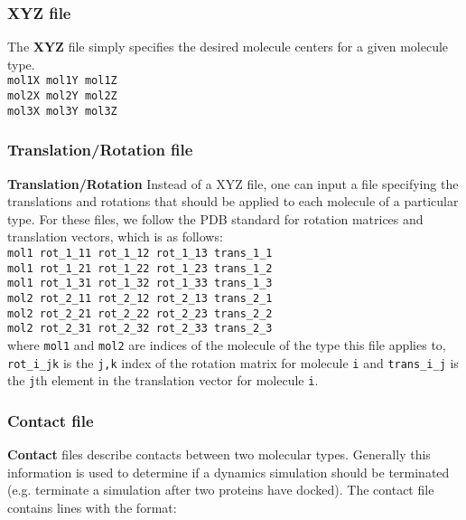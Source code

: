\subsubsection{XYZ file}

The \textbf{XYZ} file simply specifies the desired molecule centers for a given molecule type. \\

\texttt{mol1X  mol1Y  mol1Z }\\
\texttt{mol2X  mol2Y  mol2Z }\\
\texttt{mol3X  mol3Y  mol3Z }

\subsubsection{Translation/Rotation file}

\textbf{Translation/Rotation} Instead of a XYZ file, one can input a file specifying the translations and rotations that should be applied to 
each molecule of a particular type. For these files, we follow the PDB standard for rotation matrices and translation vectors, 
which is as follows: \\

\texttt{mol1 rot\_1\_11 rot\_1\_12 rot\_1\_13 trans\_1\_1} \\
\texttt{mol1 rot\_1\_21 rot\_1\_22 rot\_1\_23 trans\_1\_2} \\
\texttt{mol1 rot\_1\_31 rot\_1\_32 rot\_1\_33 trans\_1\_3} \\
\texttt{mol2 rot\_2\_11 rot\_2\_12 rot\_2\_13 trans\_2\_1} \\
\texttt{mol2 rot\_2\_21 rot\_2\_22 rot\_2\_23 trans\_2\_2} \\
\texttt{mol2 rot\_2\_31 rot\_2\_32 rot\_2\_33 trans\_2\_3} \\

where \texttt{mol1} and \texttt{mol2} are indices of the molecule of the type this file applies to, \texttt{rot\_i\_jk} is the \texttt{j,k} index
of the rotation matrix for molecule \texttt{i} and \texttt{trans\_i\_j} is the \texttt{j}th element in the translation vector for molecule \texttt{i}.

\subsubsection{Contact file}
\textbf{Contact} files describe contacts between two molecular types. Generally this information is used to determine if a dynamics 
simulation should be terminated (e.g. terminate a simulation after two proteins have docked). The contact file contains lines with the format: \\

